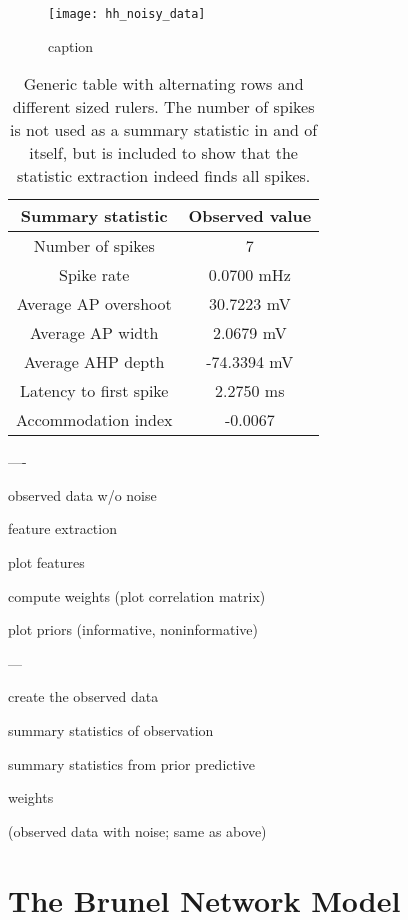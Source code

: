 \begin{figure}[H]
    \centering
    \texttt{[image: hh\_noisy\_data]}
    \caption{caption}
    \label{fig:fig1}
\end{figure} 


\begin{table}[H]
  \caption{Generic table with alternating rows and different sized rulers. The number of spikes is not used as a summary statistic in and of itself, but is included to show that the statistic extraction indeed finds all spikes.}
  \begin{center}
    \begin{tabular}{cc}
      \toprule
      \textbf{Summary statistic} & \textbf{Observed value} \\
      \midrule
      Number of spikes &  7 \\
      Spike rate &  0.0700 mHz \\
      Average AP overshoot & 30.7223 mV  \\
      Average AP width & 2.0679 mV \\
      Average AHP depth & -74.3394 mV \\
      Latency to first spike & 2.2750 ms \\
      Accommodation index &  -0.0067 \\
      \bottomrule
    \end{tabular}
  \end{center}
  \label{tab:hh_noisy_sumstats}
\end{table}



----

observed data w/o noise 

feature extraction 

plot features 

compute weights (plot correlation matrix) 

plot priors (informative, noninformative)


---

create the observed data

summary statistics of observation 

summary statistics from prior predictive

weights

(observed data with noise; same as above)

\section{The Brunel Network Model}

